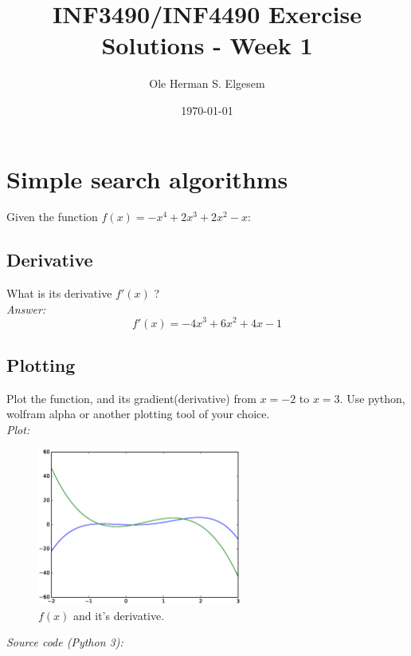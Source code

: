 \documentclass{article}           %
\title{\vspace{-2cm}INF3490/INF4490 Exercise Solutions - Week 1}
\author{Ole Herman S. Elgesem}
\date{\today}
\newcommand\marginsymbol[1][0pt]{%
  \tabto*{0cm}\makebox[\dimexpr-1cm-#1\relax][r]{$\mathbb{P}$}\tabto*{\TabPrevPos}}
\begin{document}
    \renewcommand\marginsymbol[1][0pt]{%
  \tabto*{0cm}\makebox[-1cm][c]{$\mathbb{P}$}\tabto*{\TabPrevPos}}

\maketitle


\section{Simple search algorithms}

Given the function \(f(x) = -x^4 + 2x^3 + 2x^2 - x\):

\subsection{Derivative}
What is its derivative \(f'(x)\) ?\\

\emph{Answer:}
\[f'(x) = -4x^3 + 6x^2 + 4x - 1\]

\subsection{Plotting \marginsymbol}
Plot the function, and its gradient(derivative) from \(x=-2\) to \(x=3\).
Use python, wolfram alpha or another plotting tool of your choice.\\

\emph{Plot:}
\begin{figure}[H]
\begin{center}
\includegraphics[width=0.6\textwidth]{eps/w1e1b.eps}
\caption{\(f(x)\) and it's derivative.}
\label{fig:w1e1b}
\end{center}
\end{figure}

\emph{Source code (Python 3):}
\inputminted{Python}{py/w1e1b.py}
\end{document}
